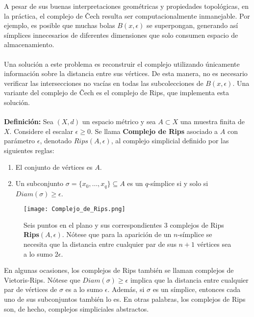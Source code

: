 \documentclass{article}
\begin{document}
A pesar de sus buenas interpretaciones geométricas y propiedades topológicas, en la práctica, el complejo de Čech resulta ser computacionalmente inmanejable. Por ejemplo, es posible que muchas bolas $B(x,\epsilon)$ se superpongan, generando así símplices innecesarios de diferentes dimensiones que solo consumen espacio de almacenamiento.\\
\\
Una solución a este problema es reconstruir el complejo utilizando únicamente información sobre la distancia entre sus vértices. De esta manera, no es necesario verificar las intersecciones no vacías en todas las subcolecciones de $B(x,\epsilon)$. Una variante del complejo de Čech es el complejo de Rips, que implementa esta solución.\\
\\
\textbf{Definición:} Sea $(X, d)$ un espacio métrico y sea $A \subset X$ una muestra finita de $X$. Considere el escalar $\epsilon \geq 0$. Se llama \textbf{Complejo de Rips} asociado a $A$ con parámetro $\epsilon$, denotado $Rips(A,\epsilon)$, al complejo simplicial definido por las siguientes reglas:
\begin{enumerate}
    \item El conjunto de vértices es $A$.
    \item Un subconjunto $\sigma = \{x_{0}, \ldots , x_{q}\} \subseteq A$ es un $q$-símplice si y solo si $Diam(\sigma)\geq \epsilon$.
\end{enumerate}
\begin{figure}[h]
  \centering
  \texttt{[image: Complejo\_de\_Rips.png]}
  \caption{Seis puntos en el plano y sus correspondientes 3 complejos de Rips \textbf{Rips$(A, \epsilon)$}. Nótese que para la aparición de un $n$-símplice se necesita que la distancia entre cualquier par de sus $n+1$ vértices sea a lo sumo $2\epsilon$.}
  \label{fig:mi_imagen}
\end{figure}
En algunas ocasiones, los complejos de Rips también se llaman complejos de Vietoris-Rips. Nótese que $Diam(\sigma)\geq \epsilon$ implica que la distancia entre cualquier par de vértices de $\sigma$ es a lo sumo $\epsilon$. Además, si $\sigma$ es un símplice, entonces cada uno de sus subconjuntos también lo es. En otras palabras, los complejos de Rips son, de hecho, complejos simpliciales abstractos.\\
\\
\end{document}

